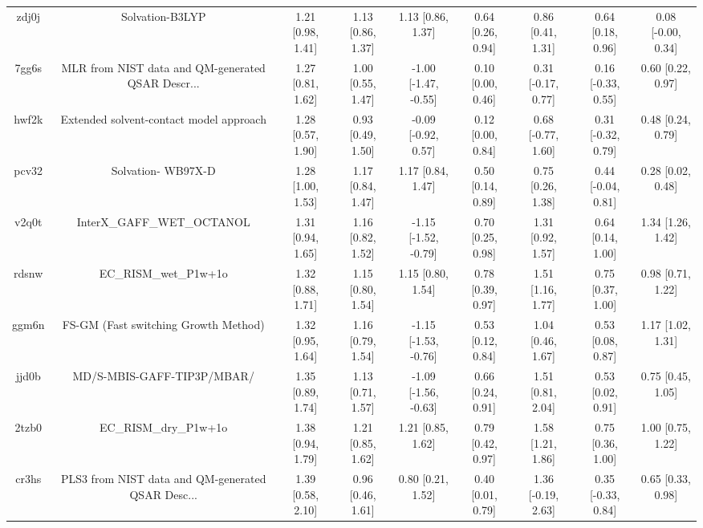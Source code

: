 \documentclass{article}
\begin{document}
\begin{center}
\begin{longtable}{|ccccccccc|}
 zdj0j &                                    Solvation-B3LYP &  1.21 [0.98, 1.41] &  1.13 [0.86, 1.37] &     1.13 [0.86, 1.37] &  0.64 [0.26, 0.94] &    0.86 [0.41, 1.31] &    0.64 [0.18, 0.96] &    0.08 [-0.00, 0.34] \\
 7gg6s &  MLR from NIST data and QM-generated QSAR Descr... &  1.27 [0.81, 1.62] &  1.00 [0.55, 1.47] &  -1.00 [-1.47, -0.55] &  0.10 [0.00, 0.46] &   0.31 [-0.17, 0.77] &   0.16 [-0.33, 0.55] &     0.60 [0.22, 0.97] \\
 hwf2k &            Extended solvent-contact model approach &  1.28 [0.57, 1.90] &  0.93 [0.49, 1.50] &   -0.09 [-0.92, 0.57] &  0.12 [0.00, 0.84] &   0.68 [-0.77, 1.60] &   0.31 [-0.32, 0.79] &     0.48 [0.24, 0.79] \\
 pcv32 &                                 Solvation- WB97X-D &  1.28 [1.00, 1.53] &  1.17 [0.84, 1.47] &     1.17 [0.84, 1.47] &  0.50 [0.14, 0.89] &    0.75 [0.26, 1.38] &   0.44 [-0.04, 0.81] &     0.28 [0.02, 0.48] \\
 v2q0t &                         InterX\_GAFF\_WET\_OCTANOL &  1.31 [0.94, 1.65] &  1.16 [0.82, 1.52] &  -1.15 [-1.52, -0.79] &  0.70 [0.25, 0.98] &    1.31 [0.92, 1.57] &    0.64 [0.14, 1.00] &     1.34 [1.26, 1.42] \\
 rdsnw &                              EC\_RISM\_wet\_P1w+1o &  1.32 [0.88, 1.71] &  1.15 [0.80, 1.54] &     1.15 [0.80, 1.54] &  0.78 [0.39, 0.97] &    1.51 [1.16, 1.77] &    0.75 [0.37, 1.00] &     0.98 [0.71, 1.22] \\
 ggm6n &               FS-GM (Fast switching Growth Method) &  1.32 [0.95, 1.64] &  1.16 [0.79, 1.54] &  -1.15 [-1.53, -0.76] &  0.53 [0.12, 0.84] &    1.04 [0.46, 1.67] &    0.53 [0.08, 0.87] &     1.17 [1.02, 1.31] \\
 jjd0b &                         MD/S-MBIS-GAFF-TIP3P/MBAR/ &  1.35 [0.89, 1.74] &  1.13 [0.71, 1.57] &  -1.09 [-1.56, -0.63] &  0.66 [0.24, 0.91] &    1.51 [0.81, 2.04] &    0.53 [0.02, 0.91] &     0.75 [0.45, 1.05] \\
 2tzb0 &                              EC\_RISM\_dry\_P1w+1o &  1.38 [0.94, 1.79] &  1.21 [0.85, 1.62] &     1.21 [0.85, 1.62] &  0.79 [0.42, 0.97] &    1.58 [1.21, 1.86] &    0.75 [0.36, 1.00] &     1.00 [0.75, 1.22] \\
 cr3hs &  PLS3 from NIST data and QM-generated QSAR Desc... &  1.39 [0.58, 2.10] &  0.96 [0.46, 1.61] &     0.80 [0.21, 1.52] &  0.40 [0.01, 0.79] &   1.36 [-0.19, 2.63] &   0.35 [-0.33, 0.84] &     0.65 [0.33, 0.98] \\

\end{longtable}
\end{center}
\end{document}
